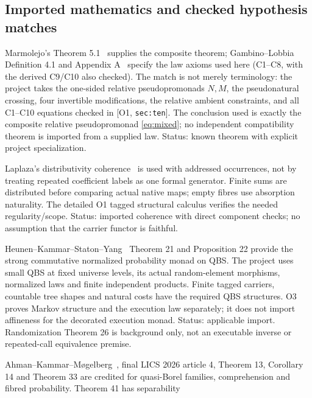 \documentclass[11pt,a4paper]{article}
\theoremstyle{definition}
\newcommand{\Addr}[2]{\textup{[#1, \texttt{#2}]}}
\begin{document}
\subsection{Imported mathematics and checked hypothesis matches}
\begin{description}[style=nextline]
\item[S01 Pseudodistributive laws and composition.]
Marmolejo's Theorem 5.1~\cite{Marmolejo} supplies the composite theorem;
Gambino--Lobbia Definition 4.1 and Appendix A~\cite{GL} specify the law
axioms used here (C1--C8, with the derived C9/C10 also checked). The match is not merely terminology: the project takes the
one-sided relative pseudopromonads \(N,M\), the pseudonatural crossing,
four invertible modifications, the relative ambient constraints, and all
C1--C10 equations checked in \Addr{O1}{sec:ten}. The conclusion used is
exactly the composite relative pseudopromonad \eqref{eq:mixed}; no
independent compatibility theorem is imported from a supplied law.
Status: known theorem with explicit project specialization.
\item[S02 Rig coherence.]
Laplaza's distributivity coherence~\cite{Laplaza} is used with addressed occurrences,
not by treating repeated coefficient labels as one formal generator.
Finite sums are distributed before comparing actual native maps; empty
fibres use absorption naturality. The detailed O1 tagged structural
calculus verifies the needed regularity/scope. Status: imported coherence
with direct component checks; no assumption that the carrier functor is
faithful.
\item[S03 Normalized QBS probability.]
Heunen--Kammar--Staton--Yang~\cite{QBS} Theorem 21 and Proposition 22 provide the
strong commutative normalized probability monad on QBS. The project uses
small QBS at fixed universe levels, its actual random-element morphisms,
normalized laws and finite independent products. Finite tagged carriers,
countable tree shapes and natural costs have the required QBS structures.
O3 proves Markov structure and the execution law separately; it does not
import affineness for the decorated execution monad. Status: applicable
import. Randomization Theorem 26 is background only, not an executable
inverse or repeated-call equivalence premise.
\item[S04 Dependent QBS and information-flow boundaries.]
Ahman--Kammar--M\o gelberg~\cite{QBF}, final LICS 2026 article 4, Theorem 13,
Corollary 14 and Theorem 33 are credited for quasi-Borel families,
comprehension and fibred probability. Theorem 41 has separability

\end{description}
\end{document}
